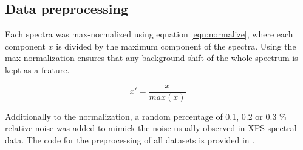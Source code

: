
\subsection{Data preprocessing}

Each spectra was max-normalized using equation \ref{eqn:normalize}, where each component $x$ is divided by the maximum component of the spectra. Using the max-normalization ensures that any background-shift of the whole spectrum is kept as a feature.

\begin{equation}
    x' = \frac{x}{max(x)}
\label{eqn:normalize}
\end{equation}

Additionally to the normalization, a random percentage of 0.1, 0.2 or 0.3 \% relative noise was added to mimick the noise usually observed in XPS spectral data. The code for the preprocessing of all datasets is provided in .